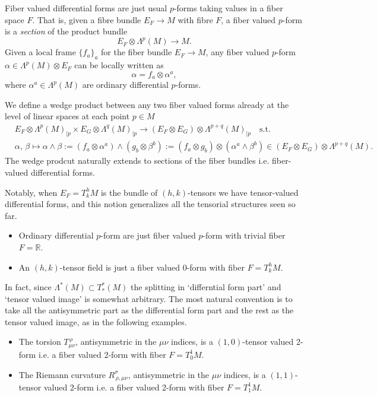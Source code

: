 \documentclass[../geometry_main.tex]{subfiles}
\begin{document}
\begin{mytheorem}
Fiber valued differential forms are just usual $p$-forms taking values in a fiber space $F$.
That is, given a fibre bundle $E_F\to M$ with fibre $F$, a fiber valued $p$-form is a \emph{section} of the product bundle
\begin{equation}
     E_F \otimes \Lambda^p (M) \to M.
\end{equation}
Given a local frame $\{f_a\}_a$ for the fiber bundle $E_F \to M$, any fiber valued $p$-form $\alpha \in \Lambda^p (M) \otimes E_F$ can be locally written as
\begin{equation}
    \alpha =  f_a \otimes \alpha^a,
\end{equation}
where $\alpha^a \in \Lambda^p (M)$ are ordinary differential $p$-forms.
\smallskip

We define a wedge product between any two fiber valued forms already at the level of linear spaces at each point $p\in M$
\begin{align}
    &E_F \otimes \Lambda^p (M)_{\mid p} \times E_G \otimes \Lambda^q (M)_{\mid p} \to (E_F \otimes E_G) \otimes \Lambda^{p+q} (M)_{\mid p} \quad \text{s.t.}\\[5pt]
    &\alpha,\,\beta \mapsto \alpha \wedge \beta := (f_a \otimes \alpha^a) \wedge (g_b \otimes \beta^b) 
    := (f_a \otimes g_b) \otimes (\alpha^a \wedge \beta^b) \in (E_F \otimes E_G) \otimes \Lambda^{p+q} (M).
\end{align}
The wedge prodcut naturally extends to sections of the fiber bundles i.e. fiber-valued differential forms.
\smallskip 

Notably, when $E_F = T^h_kM$ is the bundle of $(h,k)$-tensors we have tensor-valued differential forms, and this notion generalizes all the tensorial structures seen so far.
\begin{itemize}
    \item Ordinary differential $p$-form are just fiber valued $p$-form with trivial fiber $F = \mathbb{R}$.
    \item An $(h,k)$-tensor field is just a fiber valued $0$-form with fiber $F = T^h_k M$.
\end{itemize}
%
In fact, since $\Lambda^*(M)\subset T^*_*(M)$ the splitting in `differntial form part' and `tensor valued image' is somewhat arbitrary.
The most natural convention is to take all the antisymmetric part as the differential form part and the rest as the tensor valued image, as in the following examples.
\begin{itemize}
    \item The torsion $T_{\mu\nu}^{\, \rho}$, antisymmetric in the $\mu\nu$ indices, is a $(1,0)$-tensor valued 2-form i.e. a fiber valued 2-form with fiber $F = T^1_0 M$.
    \item The Riemann curvature $R_{\,\rho, \mu \nu}^{\sigma}$, antisymmetric in the $\mu\nu$ indices, is a $(1,1)$-tensor valued 2-form i.e. a fiber valued 2-form with fiber $F = T^1_1 M$.
\end{itemize}
\end{mytheorem}
\end{document}
